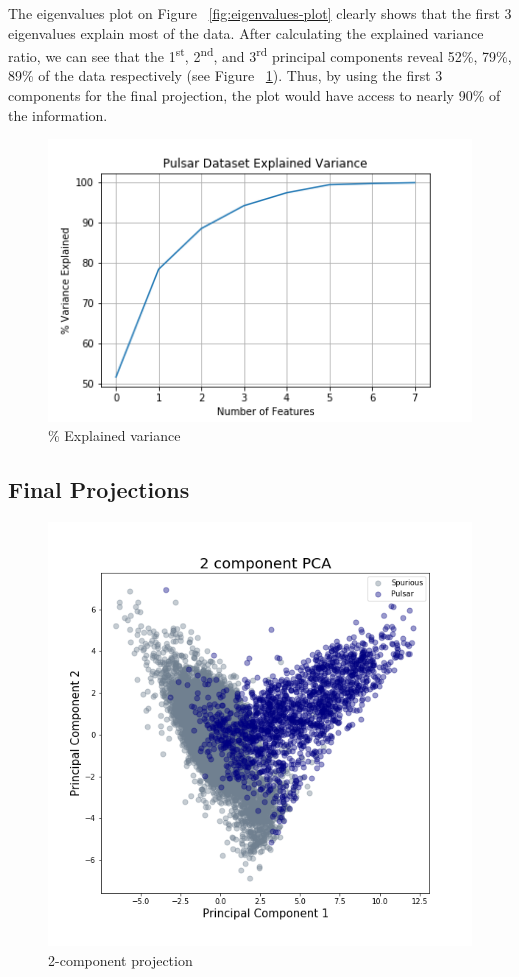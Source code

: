 \documentclass[a4paper,12pt]{article}
\begin{document}
    \newpage

    The eigenvalues plot on Figure ~\ref{fig:eigenvalues-plot} clearly shows that the first 3 eigenvalues explain most of the data. After calculating the explained variance ratio, we can see that the 1\textsuperscript{st}, 2\textsuperscript{nd}, and 3\textsuperscript{rd} principal components reveal 52\%, 79\%, 89\% of the data respectively (see Figure ~\ref{fig:eigenvalues-plot-percent}). Thus, by using the first 3 components for the final projection, the plot would have access to nearly 90\% of the information.

    \begin{figure}[ht!]
        \centering
        \includegraphics[width=.75\textwidth]{eigen-percent}
        \caption{\% Explained variance}
        \label{fig:eigenvalues-plot-percent}
    \end{figure}

    \newpage

    \subsection{Final Projections}

    \begin{figure}[ht!]
        \centering
        \includegraphics[clip, trim = 0 1cm 0 1.7cm, height=.61\textwidth]{2component-projection}
        \caption{2-component projection}
    \end{figure}
\end{document}
